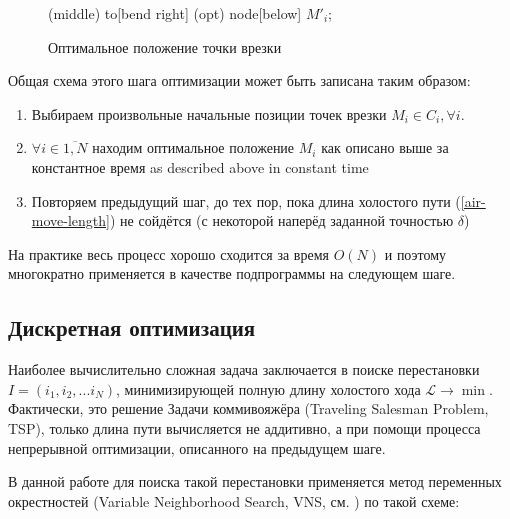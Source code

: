 \documentclass[14pt]{extarticle}
\theoremstyle{plain}%
\theoremstyle{definition}
\theoremstyle{remark}
\begin{document}
\begin{figure}
{{       (middle) to[bend right] (opt) node[below] {$M'_i$};
    }
  }
  \caption{Оптимальное положение точки врезки}
  \label{shift-pierce-point}
\end{figure}

Общая схема этого шага оптимизации может быть записана таким образом:
\begin{enumerate}
  \item
  Выбираем произвольные начальные позиции точек врезки
  $M_i \in C_i, \forall i$.
  \item
  $\forall i \in \overline{1,N}$
  находим оптимальное положение
  $M_i$
  как описано выше за константное время
  as described above in constant time
  \item
  Повторяем предыдущий шаг,
  до тех пор,
  пока длина холостого пути
  (\ref{air-move-length})
  не сойдётся
  (с некоторой наперёд заданной точностью $\delta$)
\end{enumerate}

На практике весь процесс хорошо сходится
за время
$O(N)$
и поэтому многократно применяется
в качестве подпрограммы на следующем шаге.

\subsection{Дискретная оптимизация}

Наиболее вычислительно сложная задача
заключается в поиске перестановки
$I = (i_1, i_2, ... i_N)$,
минимизирующей полную длину холостого хода
$\mathcal{L} \to \min$.
Фактически,
это решение
Задачи коммивояжёра
(Traveling Salesman Problem, TSP),
только длина пути вычисляется
не аддитивно,
а при помощи процесса
непрерывной оптимизации,
описанного на предыдущем шаге.

В данной работе для поиска
такой перестановки применяется
метод переменных окрестностей
(Variable Neighborhood Search,
VNS, см. \cite{bi14})
по такой схеме:
\end{document}
